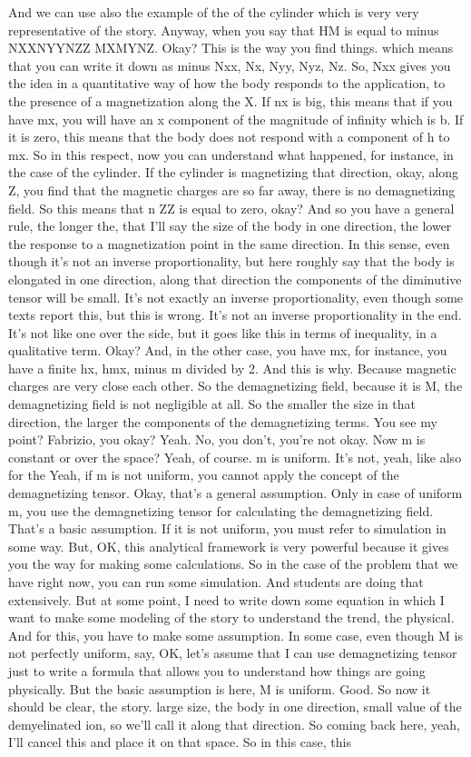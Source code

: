 And we can use also the example of the of the cylinder which is very very representative of the story. Anyway, when you say that HM is equal to minus NXXNYYNZZ MXMYNZ. Okay? This is the way you find things. which means that you can write it down as minus Nxx, Nx, Nyy, Nyz, Nz. So, Nxx gives you the idea in a quantitative way of how the body responds to the application, to the presence of a magnetization along the X. If nx is big, this means that if you have mx, you will have an x component of the magnitude of infinity which is b. If it is zero, this means that the body does not respond with a component of h to mx. So in this respect, now you can understand what happened, for instance, in the case of the cylinder. If the cylinder is magnetizing that direction, okay, along Z, you find that the magnetic charges are so far away, there is no demagnetizing field. So this means that n ZZ is equal to zero, okay? And so you have a general rule, the longer the, that I'll say the size of the body in one direction, the lower the response to a magnetization point in the same direction. In this sense, even though it's not an inverse proportionality, but here roughly say that the body is elongated in one direction, along that direction the components of the diminutive tensor will be small. It's not exactly an inverse proportionality, even though some texts report this, but this is wrong. It's not an inverse proportionality in the end. It's not like one over the side, but it goes like this in terms of inequality, in a qualitative term. Okay? And, in the other case, you have mx, for instance, you have a finite hx, hmx, minus m divided by 2. And this is why. Because magnetic charges are very close each other. So the demagnetizing field, because it is M, the demagnetizing field is not negligible at all. So the smaller the size in that direction, the larger the components of the demagnetizing terms. You see my point? Fabrizio, you okay? Yeah. No, you don't, you're not okay. Now m is constant or over the space? Yeah, of course. m is uniform. It's not, yeah, like also for the Yeah, if m is not uniform, you cannot apply the concept of the demagnetizing tensor. Okay, that's a general assumption. Only in case of uniform m, you use the demagnetizing tensor for calculating the demagnetizing field. That's a basic assumption. If it is not uniform, you must refer to simulation in some way. But, OK, this analytical framework is very powerful because it gives you the way for making some calculations. So in the case of the problem that we have right now, you can run some simulation. And students are doing that extensively. But at some point, I need to write down some equation in which I want to make some modeling of the story to understand the trend, the physical. And for this, you have to make some assumption. In some case, even though M is not perfectly uniform, say, OK, let's assume that I can use demagnetizing tensor just to write a formula that allows you to understand how things are going physically. But the basic assumption is here, M is uniform. Good. So now it should be clear, the story. large size, the body in one direction, small value of the demyelinated ion, so we'll call it along that direction. So coming back here, yeah, I'll cancel this and place it on that space. So in this case, this 